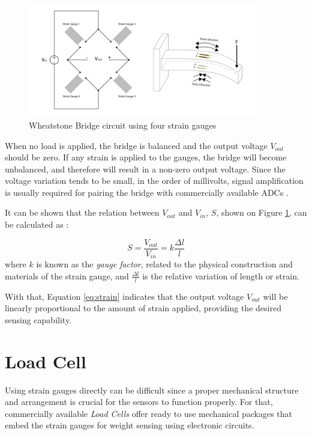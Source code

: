 \documentclass[openright]{normas-utf-tex} %
\begin{document}
\begin{figure}[H]
	\centering
	\includegraphics[width=0.9\textwidth]{./images/straingauge2.png}
	\caption[Wheatstone Bridge circuit using four strain gauges]{Wheatstone Bridge circuit using four strain gauges}
	\label{fig:gauge2}
\end{figure}

When no load is applied, the bridge is balanced and the output voltage
$V_{out}$ should be zero. If any strain is applied to the gauges, the bridge
will become unbalanced, and therefore will result in a non-zero output voltage.
Since the voltage variation tends to be small, in the order of millivolts, signal amplification is usually
required for pairing the bridge with commercially available ADCs \cite{HorowitzHill2015}.

It can be shown that the relation between $V_{out}$ and $V_{in}$, $S$, shown on Figure \ref{fig:gauge2}, can be
calculated as \cite{Stefanescu}:

\begin{equation}
    \label{eq:strain}
    S = \frac{V_{out}}{V_{in}} = k\frac{\Delta l}{l}
\end{equation}
where $k$ is known as the \textit{gauge factor}, related to the physical
construction and materials of the strain gauge, and $\frac{\Delta l}{l}$ is the
relative variation of length or strain.

With that, Equation \ref{eq:strain} indicates that the output voltage $V_{out}$
will be linearly proportional to the amount of strain applied, providing the
desired sensing capability.

\section{Load Cell}

Using strain gauges directly can be difficult since a proper
mechanical structure and arrangement is crucial for the sensors to function
properly. For that, commercially available \textit{Load Cells} offer ready to
use mechanical packages that embed the strain gauges for weight sensing
using electronic circuits.
\end{document}

